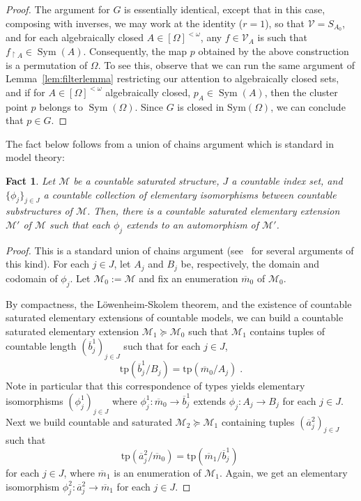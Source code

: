 \documentclass{article}
\newtheorem{fact}[theorem]{Fact}
\theoremstyle{remark}
\theoremstyle{definition}
\newcommand{\M}[0]{\mathcal{M}}
\newcommand{\nn}[0]{S}%
\newcommand{\V}[0]{\mathcal{V}}
\newcommand{\fps}[1]{[#1]^{<\omega}}
\DeclareMathOperator{\Sym}{Sym}
\begin{document}
{{{{{\begin{proof}
  

   




   {The argument  for $G$ is essentially identical, except that in this case, 
   composing with inverses, we may work at the identity ($r = 1$), so that $\V = \nn_{A_0}$, and for each algebraically closed $A\in\fps{\Omega}$,  any $f\in\V_A$ is such that $f_{\upharpoonright A}\in\Sym(A)$. Consequently, the map $p$ obtained by the above construction is a permutation of $\Omega$. To see this, observe that we can run the same argument of Lemma~\ref{lem:filterlemma} restricting our attention to algebraically closed sets, and if for $A\in\fps{\Omega}$ algebraically closed, $p_A\in\Sym(A)$, then the cluster point $p$ belongs to $\Sym(\Omega)$. Since
  $G$ is
  closed in $\mathrm{Sym}(\Omega)$, we can conclude that  $p \in G$.}
   \end{proof}
 The fact below follows from a union of chains argument which is standard in model theory:
\begin{fact}\label{extensions of isomorphisms}
	Let $\M$ be a countable saturated structure, $J$ a countable index set, and $\{\phi_{j}\}_{j\in J}$ a countable collection of elementary isomorphisms between countable substructures of $\M$. Then, there is a countable saturated elementary extension
    $\M'$ of $\M$ such that each $\phi_{j}$  extends to an automorphism of $\M'$.  
\end{fact}
\begin{proof} 
This is a standard union of chains argument (see~\cite[Chapters 2, 4, and 5]{tent2012course} for several arguments of this kind). For each $j\in J$, let $A_j$ and $B_j$ be, respectively, the domain and codomain of $\phi_j$. Let $\M_0:=\M$ and fix an enumeration $\overline{m}_0$ of $\M_0$.

By compactness, {the L\"{o}wenheim-Skolem theorem, and the existence of countable saturated elementary extensions of countable models,} we can build a countable saturated elementary extension $\M_1\succeq \M_0$ such that $\M_1$ contains tuples of countable length $(\overline{b}^1_j)_{j\in J}$ such that for each $j\in J$, 
\[\mathrm{tp}(\overline{b}^1_j/B_j)=\mathrm{tp}(\overline{m}_0/A_j)\;.\]
Note in particular that this correspondence of types yields elementary isomorphisms $(\phi^1_j)_{j\in J}$ where $\phi^1_j: \overline{m}_{0}\to \overline{b}^1_j$ extends $\phi_j:A_j\to B_j$  for each $j\in J$. Next we build countable and saturated $\M_2\succeq\M_1$ containing tuples $(\overline{a}^2_j)_{j\in J}$ such that 
\[\mathrm{tp}(\overline{a}^2_j/\overline m_{0})=\mathrm{tp}(\overline m_{1}/\overline{b}^1_j)\;\]
for each $j\in J$, where $\overline{m}_1$ is an enumeration of $\mathcal{M}_1$.
Again, we get an elementary isomorphism  $\phi^2_j: \overline{a}^2_j\to \overline m_{1}$  for each $j\in J$.


\end{proof}}}}}}
\end{document}
